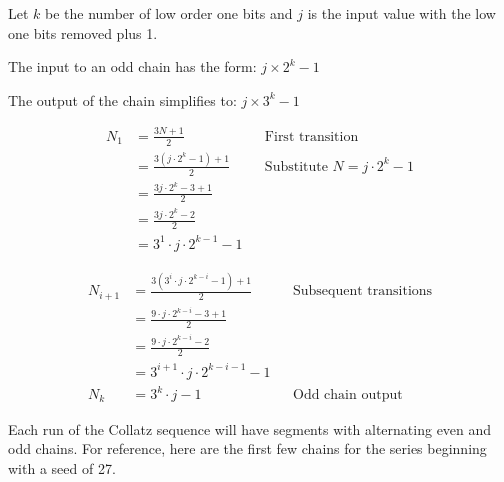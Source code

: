 \documentclass[letterpaper]{article}
\begin{document}
\begin{multicols}{2}
Let \( k \) be the number of low order one bits and \( j \) is the input value with the low one bits removed plus 1.

The input to an odd chain has the form: \( j \times 2^k - 1 \)

The output of the chain simplifies to: \( j \times 3^k - 1 \)

\begin{align*}
    N_1 &= \frac{3N + 1}{2} & &\text{First transition} \\
        &= \frac{3(j \cdot 2^k - 1) + 1}{2} & &\text{Substitute } N = j \cdot 2^k - 1 \\
        &= \frac{3j \cdot 2^k - 3 + 1}{2} \\
        &= \frac{3j \cdot 2^k - 2}{2} \\
        &= 3^1 \cdot j \cdot 2^{k-1} - 1
\end{align*}

\begin{align*}
    N_{i+1} &= \frac{3 \left(3^i \cdot j \cdot 2^{k-i} - 1\right) + 1}{2} & &\text{Subsequent transitions} \\
            &= \frac{9 \cdot j \cdot 2^{k-i} - 3 + 1}{2} \\
            &= \frac{9 \cdot j \cdot 2^{k-i} - 2}{2} \\
            &= 3^{i+1} \cdot j \cdot 2^{k-i-1} - 1 \\
    N_k     &= 3^k \cdot j - 1 & &\text{Odd chain output}
\end{align*}

Each run of the Collatz sequence will have segments with alternating even and odd chains. For reference, here are the first few chains for the series beginning with a seed of 27.


\end{multicols}
\end{document}
